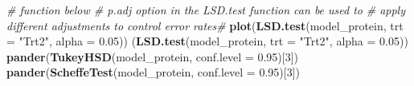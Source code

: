 \documentclass[]{article}
\newenvironment{Shaded}{\begin{snugshade}}{\end{snugshade}}
\newcommand{\CommentTok}[1]{\textcolor[rgb]{0.56,0.35,0.01}{\textit{#1}}}
\newcommand{\DataTypeTok}[1]{\textcolor[rgb]{0.13,0.29,0.53}{#1}}
\newcommand{\DecValTok}[1]{\textcolor[rgb]{0.00,0.00,0.81}{#1}}
\newcommand{\FloatTok}[1]{\textcolor[rgb]{0.00,0.00,0.81}{#1}}
\newcommand{\KeywordTok}[1]{\textcolor[rgb]{0.13,0.29,0.53}{\textbf{#1}}}
\newcommand{\NormalTok}[1]{#1}
\newcommand{\StringTok}[1]{\textcolor[rgb]{0.31,0.60,0.02}{#1}}
\begin{document}
\begin{Shaded}
\begin{Highlighting}[]
\CommentTok{# function below # p.adj option in the LSD.test function can be used to}
\CommentTok{# apply different adjustments to control error rates#}
\KeywordTok{plot}\NormalTok{(}\KeywordTok{LSD.test}\NormalTok{(model_protein, }\DataTypeTok{trt =} \StringTok{"Trt2"}\NormalTok{, }\DataTypeTok{alpha =} \FloatTok{0.05}\NormalTok{))}
\NormalTok{(}\KeywordTok{LSD.test}\NormalTok{(model_protein, }\DataTypeTok{trt =} \StringTok{"Trt2"}\NormalTok{, }\DataTypeTok{alpha =} \FloatTok{0.05}\NormalTok{))}
\KeywordTok{pander}\NormalTok{(}\KeywordTok{TukeyHSD}\NormalTok{(model_protein, }\DataTypeTok{conf.level =} \FloatTok{0.95}\NormalTok{)[}\DecValTok{3}\NormalTok{])}
\KeywordTok{pander}\NormalTok{(}\KeywordTok{ScheffeTest}\NormalTok{(model_protein, }\DataTypeTok{conf.level =} \FloatTok{0.95}\NormalTok{)[}\DecValTok{3}\NormalTok{])}
\end{Highlighting}
\end{Shaded}
\end{document}
